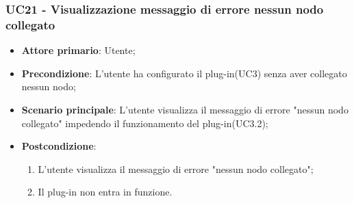 \subsubsection{UC21 - Visualizzazione messaggio di errore nessun nodo collegato}
\label{sssec:uc21}
\begin{itemize}
  \item \textbf{Attore primario}: Utente;
  \item \textbf{Precondizione}: L'utente ha configurato il plug-in(UC3) senza aver collegato nessun nodo;
  \item \textbf{Scenario principale}: L'utente visualizza il messaggio di errore "nessun nodo collegato" impedendo il funzionamento del plug-in(UC3.2);
  \item \textbf{Postcondizione}:
  \begin{enumerate}
		\item L'utente visualizza il messaggio di errore "nessun nodo collegato";
		\item Il plug-in non entra in funzione.
	\end{enumerate}
\end{itemize}
